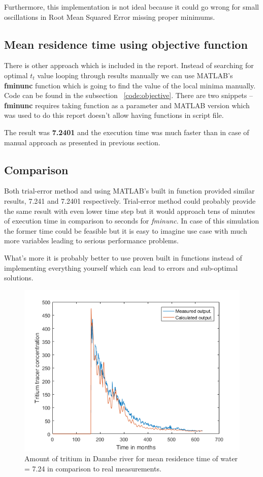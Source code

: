 \documentclass[12pt]{article}
\begin{document}
Furthermore, this implementation is not ideal because it could go wrong for small oscillations in Root Mean Squared Error missing proper minimums.

\subsection{Mean residence time using objective function}

There is other approach which is included in the report. Instead of searching for optimal $t_t$ value looping through results manually we can use MATLAB's \textbf{fminunc} function which is going to find the value of the local minima manually. Code can be found in the subsection ~\ref{code:objective}. There are two snippets -- \textbf{fminunc} requires taking function as a parameter and MATLAB version which was used to do this report doesn't allow having functions in script file.

The result was \textbf{7.2401} and the execution time was much faster than in case of manual approach as presented in previous section.

\subsection{Comparison}

Both trial-error method and using MATLAB's built in function provided similar results, 7.241 and 7.2401 respectively. Trial-error method could probably provide the same result with even lower time step but it would approach tens of minutes of execution time in comparison to seconds for \textit{fminunc}. In case of this simulation the former time could be feasible but it is easy to imagine use case with much more variables leading to serious performance problems.

What's more it is probably better to use proven built in functions instead of implementing everything yourself which can lead to errors and sub-optimal solutions.

\begin{figure}[H]
	\centering
	\includegraphics[width=\textwidth]{finalPlot}
	\caption{Amount of tritium in Danube river for mean residence time of water = 7.24 in comparison to real measurements.}
\end{figure}
\end{document}
